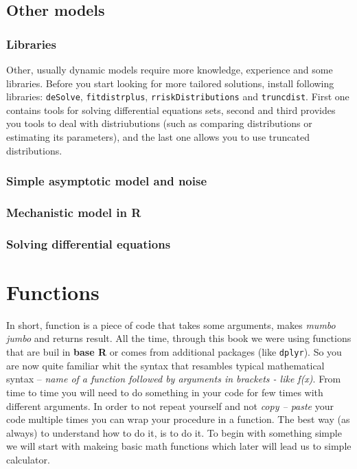 \documentclass[]{book}
\theoremstyle{definition}
\theoremstyle{definition}
\theoremstyle{definition}
\theoremstyle{remark}
\begin{document}
\section{Other models}\label{other-models}

\subsection{Libraries}\label{libraries}

Other, usually dynamic models require more knowledge, experience and
some libraries. Before you start looking for more tailored solutions,
install following libraries: \texttt{deSolve}, \texttt{fitdistrplus},
\texttt{rriskDistributions} and \texttt{truncdist}. First one contains
tools for solving differential equations sets, second and third provides
you tools to deal with distriubutions (such as comparing distributions
or estimating its parameters), and the last one allows you to use
truncated distributions.

\subsection{Simple asymptotic model and
noise}\label{simple-asymptotic-model-and-noise}

\subsection{\texorpdfstring{Mechanistic model in
\textbf{R}}{Mechanistic model in R}}\label{mechanistic-model-in-r}

\subsection{Solving differential
equations}\label{solving-differential-equations}

\chapter{Functions}\label{functions-1}

In short, function is a piece of code that takes some arguments, makes
\emph{mumbo jumbo} and returns result. All the time, through this book
we were using functions that are buil in \textbf{base R} or comes from
additional packages (like \texttt{dplyr}). So you are now quite familiar
whit the syntax that resambles typical mathematical syntax -- \emph{name
of a function followed by arguments in brackets - like f(x)}. From time
to time you will need to do something in your code for few times with
different arguments. In order to not repeat yourself and not \emph{copy
-- paste} your code multiple times you can wrap your procedure in a
function. The best way (as always) to understand how to do it, is to do
it. To begin with something simple we will start with makeing basic math
functions which later will lead us to simple calculator.
\end{document}
